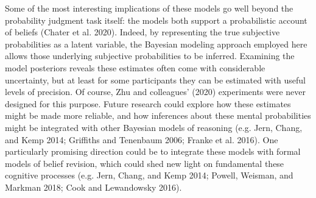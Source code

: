 \documentclass{article}
\begin{document}
Some of the most interesting implications of these models go well beyond
the probability judgment task itself: the models both support a
probabilistic account of beliefs (Chater et al. 2020). Indeed, by
representing the true subjective probabilities as a latent variable, the
Bayesian modeling approach employed here allows those underlying
subjective probabilities to be inferred. Examining the model posteriors
reveals these estimates often come with considerable uncertainty, but at
least for some participants they can be estimated with useful levels of
precision. Of course, Zhu and colleagues' (2020) experiments were never
designed for this purpose. Future research could explore how these
estimates might be made more reliable, and how inferences about these
mental probabilities might be integrated with other Bayesian models of
reasoning (e.g. Jern, Chang, and Kemp 2014; Griffiths and Tenenbaum
2006; Franke et al. 2016). One particularly promising direction could be
to integrate these models with formal models of belief revision, which
could shed new light on fundamental these cognitive processes (e.g.
Jern, Chang, and Kemp 2014; Powell, Weisman, and Markman 2018; Cook and
Lewandowsky 2016).
\end{document}
